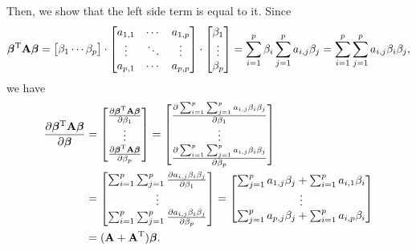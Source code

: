 Then, we show that the left side term is equal to it. Since 
\begin{align*}
\bm{\beta}^{\rm T} \bm{\mathrm{A}} \bm{\beta} =
\begin{bmatrix}
\beta_{1} \cdots \beta_{p}
\end{bmatrix}
\cdot
\begin{bmatrix}
a_{1,1} & \cdots & a_{1,p} \\
\vdots & \ddots & \vdots \\
a_{p,1} & \cdots & a_{p,p} \\
\end{bmatrix}
\cdot
\begin{bmatrix}
\beta_{1}\\
\vdots\\
\beta_{p}
\end{bmatrix}
= \sum_{i=1}^{p}\beta_{i} \sum_{j=1}^{p} a_{i,j}\beta_{j}
= \sum_{i=1}^{p} \sum_{j=1}^{p} a_{i,j} \beta_{i} \beta_{j},
\end{align*}
we have
\begin{align*}
\frac{\partial \bm{\beta}^{\rm T}\bm{\mathrm{A}}\bm{\beta}}{\partial \bm{\beta}}
&=
\begin{bmatrix}
\frac{\partial \bm{\beta}^{\rm T}\bm{\mathrm{A}}\bm{\beta}}{\partial \beta_{1}}\\
\vdots\\
\frac{\partial \bm{\beta}^{\rm T}\bm{\mathrm{A}}\bm{\beta}}{\partial \beta_{p}}\\
\end{bmatrix}
=
\begin{bmatrix}
\frac{\partial \sum_{i=1}^{p} \sum_{j=1}^{p} a_{i,j} \beta_{i} \beta_{j}}{\partial \beta_{1}}\\
\vdots\\
\frac{\partial \sum_{i=1}^{p} \sum_{j=1}^{p} a_{i,j} \beta_{i} \beta_{j}}{\partial \beta_{p}}\\
\end{bmatrix}
\\
&=
\begin{bmatrix}
\sum_{i=1}^{p} \sum_{j=1}^{p} \frac{ \partial a_{i,j} \beta_{i} \beta_{j}}{\partial \beta_{1}}\\
\vdots\\
\sum_{i=1}^{p} \sum_{j=1}^{p} \frac{\partial a_{i,j} \beta_{i} \beta_{j}}{\partial \beta_{p}}\\
\end{bmatrix}
=
\begin{bmatrix}
\sum_{j=1}^{p} a_{1,j} \beta_{j} + \sum_{i=1}^{p} a_{i,1} \beta_{i}\\
\vdots\\
\sum_{j=1}^{p} a_{p,j} \beta_{j} + \sum_{i=1}^{p} a_{i,p} \beta_{i}\\
\end{bmatrix}
\\
&= (\bm{\mathrm{A}} + \bm{\mathrm{A}}^{\rm T})\bm{\beta}.
\end{align*}

